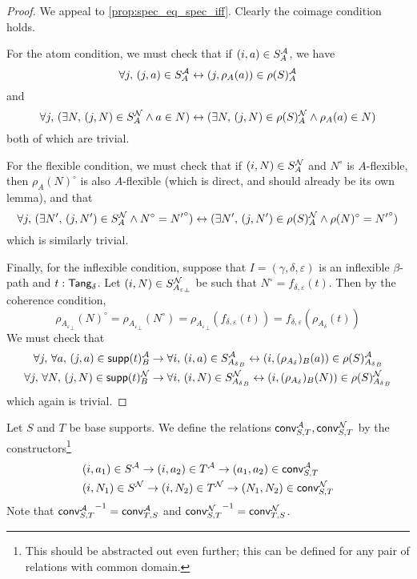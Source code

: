 \begin{proof}
  We appeal to \cref{prop:spec_eq_spec_iff}.
  Clearly the coimage condition holds.

  For the atom condition, we must check that if \( (i, a) \in S_A^{\mathcal A} \), we have
  \[ \forall j,\, (j, a) \in S_A^{\mathcal A} \leftrightarrow (j, \rho_A(a)) \in \rho(S)_A^{\mathcal A} \]
  and
  \[ \forall j,\, (\exists N,\, (j, N) \in S_A^{\mathcal N} \wedge a \in N) \leftrightarrow (\exists N,\, (j, N) \in \rho(S)_A^{\mathcal N} \wedge \rho_A(a) \in N) \]
  both of which are trivial.

  For the flexible condition, we must check that if \( (i, N) \in S_A^{\mathcal N} \) and \( N^\circ \) is \( A \)-flexible, then \( \rho_A(N)^\circ \) is also \( A \)-flexible (which is direct, and should already be its own lemma), and that
  \[ \forall j,\, (\exists N',\, (j, N') \in S_A^{\mathcal N} \wedge N^\circ = {N'}^\circ) \leftrightarrow (\exists N',\, (j, N') \in \rho(S)_A^{\mathcal N} \wedge \rho(N)^\circ = {N'}^\circ) \]
  which is similarly trivial.

  Finally, for the inflexible condition, suppose that \( I = (\gamma,\delta,\varepsilon) \) is an inflexible \( \beta \)-path and \( t : \mathsf{Tang}_\delta \).
  Let \( (i, N) \in S_{{A_\varepsilon}_\bot}^{\mathcal N} \) be such that \( N^\circ = f_{\delta,\varepsilon}(t) \).
  Then by the coherence condition,
  \[ \rho_{{A_\varepsilon}_\bot}(N)^\circ = \rho_{{A_\varepsilon}_\bot}(N^\circ) = \rho_{{A_\varepsilon}_\bot}(f_{\delta,\varepsilon}(t)) = f_{\delta,\varepsilon}(\rho_{A_\delta}(t)) \]
  We must check that
  \begin{align*}
    \forall j,\, \forall a,\, (j, a) \in \operatorname{\mathsf{supp}}(t)_B^{\mathcal A} &\to \forall i,\, (i, a) \in S_{{A_\delta}_B}^{\mathcal A} \leftrightarrow (i, (\rho_{A_\delta})_B(a)) \in \rho(S)_{{A_\delta}_B}^{\mathcal A} \\
    \forall j,\, \forall N,\, (j, N) \in \operatorname{\mathsf{supp}}(t)_B^{\mathcal N} &\to \forall i,\, (i, N) \in S_{{A_\delta}_B}^{\mathcal N} \leftrightarrow (i, (\rho_{A_\delta})_B(N)) \in \rho(S)_{{A_\delta}_B}^{\mathcal N}
  \end{align*}
  which again is trivial.
\end{proof}
\begin{definition}
  \label{def:conv_base}
  Let \( S \) and \( T \) be base supports.
  We define the relations \( \operatorname{\mathsf{conv}}_{S,T}^{\mathcal A}, \operatorname{\mathsf{conv}}_{S,T}^{\mathcal N} \) by the constructors\footnote{This should be abstracted out even further; this can be defined for any pair of relations with common domain.}
  \begin{align*}
    &(i, a_1) \in S^{\mathcal A} \to (i, a_2) \in T^{\mathcal A} \to (a_1, a_2) \in \operatorname{\mathsf{conv}}_{S,T}^{\mathcal A} \\
    &(i, N_1) \in S^{\mathcal N} \to (i, N_2) \in T^{\mathcal N} \to (N_1, N_2) \in \operatorname{\mathsf{conv}}_{S,T}^{\mathcal N}
  \end{align*}
  Note that \( {\operatorname{\mathsf{conv}}_{S,T}^{\mathcal A}}^{-1} = \operatorname{\mathsf{conv}}_{T,S}^{\mathcal A} \) and \( {\operatorname{\mathsf{conv}}_{S,T}^{\mathcal N}}^{-1} = \operatorname{\mathsf{conv}}_{T,S}^{\mathcal N} \).
\end{definition}
